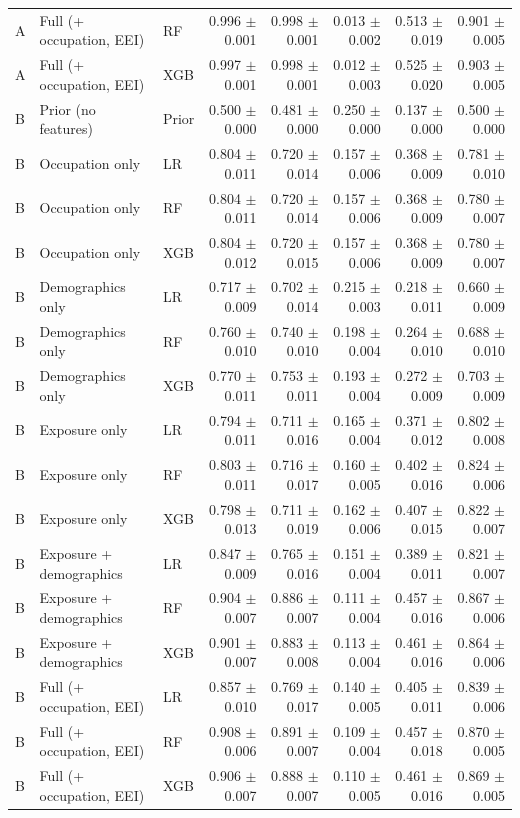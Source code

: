 \begin{tabular}{lllrrrrr}
A & Full (+ occupation, EEI) & RF & 0.996 $\pm$ 0.001 & 0.998 $\pm$ 0.001 & 0.013 $\pm$ 0.002 & 0.513 $\pm$ 0.019 & 0.901 $\pm$ 0.005 \\
A & Full (+ occupation, EEI) & XGB & 0.997 $\pm$ 0.001 & 0.998 $\pm$ 0.001 & 0.012 $\pm$ 0.003 & 0.525 $\pm$ 0.020 & 0.903 $\pm$ 0.005 \\
\midrule
B & Prior (no features) & Prior & 0.500 $\pm$ 0.000 & 0.481 $\pm$ 0.000 & 0.250 $\pm$ 0.000 & 0.137 $\pm$ 0.000 & 0.500 $\pm$ 0.000 \\
\midrule
B & Occupation only & LR & 0.804 $\pm$ 0.011 & 0.720 $\pm$ 0.014 & 0.157 $\pm$ 0.006 & 0.368 $\pm$ 0.009 & 0.781 $\pm$ 0.010 \\
B & Occupation only & RF & 0.804 $\pm$ 0.011 & 0.720 $\pm$ 0.014 & 0.157 $\pm$ 0.006 & 0.368 $\pm$ 0.009 & 0.780 $\pm$ 0.007 \\
B & Occupation only & XGB & 0.804 $\pm$ 0.012 & 0.720 $\pm$ 0.015 & 0.157 $\pm$ 0.006 & 0.368 $\pm$ 0.009 & 0.780 $\pm$ 0.007 \\
\midrule
B & Demographics only & LR & 0.717 $\pm$ 0.009 & 0.702 $\pm$ 0.014 & 0.215 $\pm$ 0.003 & 0.218 $\pm$ 0.011 & 0.660 $\pm$ 0.009 \\
B & Demographics only & RF & 0.760 $\pm$ 0.010 & 0.740 $\pm$ 0.010 & 0.198 $\pm$ 0.004 & 0.264 $\pm$ 0.010 & 0.688 $\pm$ 0.010 \\
B & Demographics only & XGB & 0.770 $\pm$ 0.011 & 0.753 $\pm$ 0.011 & 0.193 $\pm$ 0.004 & 0.272 $\pm$ 0.009 & 0.703 $\pm$ 0.009 \\
\midrule
B & Exposure only & LR & 0.794 $\pm$ 0.011 & 0.711 $\pm$ 0.016 & 0.165 $\pm$ 0.004 & 0.371 $\pm$ 0.012 & 0.802 $\pm$ 0.008 \\
B & Exposure only & RF & 0.803 $\pm$ 0.011 & 0.716 $\pm$ 0.017 & 0.160 $\pm$ 0.005 & 0.402 $\pm$ 0.016 & 0.824 $\pm$ 0.006 \\
B & Exposure only & XGB & 0.798 $\pm$ 0.013 & 0.711 $\pm$ 0.019 & 0.162 $\pm$ 0.006 & 0.407 $\pm$ 0.015 & 0.822 $\pm$ 0.007 \\
\midrule
B & Exposure + demographics & LR & 0.847 $\pm$ 0.009 & 0.765 $\pm$ 0.016 & 0.151 $\pm$ 0.004 & 0.389 $\pm$ 0.011 & 0.821 $\pm$ 0.007 \\
B & Exposure + demographics & RF & 0.904 $\pm$ 0.007 & 0.886 $\pm$ 0.007 & 0.111 $\pm$ 0.004 & 0.457 $\pm$ 0.016 & 0.867 $\pm$ 0.006 \\
B & Exposure + demographics & XGB & 0.901 $\pm$ 0.007 & 0.883 $\pm$ 0.008 & 0.113 $\pm$ 0.004 & 0.461 $\pm$ 0.016 & 0.864 $\pm$ 0.006 \\
\midrule
B & Full (+ occupation, EEI) & LR & 0.857 $\pm$ 0.010 & 0.769 $\pm$ 0.017 & 0.140 $\pm$ 0.005 & 0.405 $\pm$ 0.011 & 0.839 $\pm$ 0.006 \\
B & Full (+ occupation, EEI) & RF & 0.908 $\pm$ 0.006 & 0.891 $\pm$ 0.007 & 0.109 $\pm$ 0.004 & 0.457 $\pm$ 0.018 & 0.870 $\pm$ 0.005 \\
B & Full (+ occupation, EEI) & XGB & 0.906 $\pm$ 0.007 & 0.888 $\pm$ 0.007 & 0.110 $\pm$ 0.005 & 0.461 $\pm$ 0.016 & 0.869 $\pm$ 0.005 \\
\bottomrule
\end{tabular}
